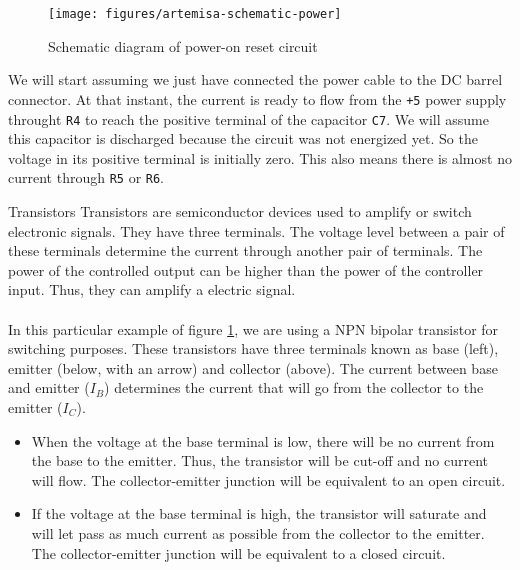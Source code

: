 \begin{figure}[h]
  \centering
  \texttt{[image: figures/artemisa-schematic-power]}
  \caption{Schematic diagram of power-on reset circuit}
  \label{fig:artemisa-schematic-por}
\end{figure}

We will start assuming we just have connected the power cable to the DC barrel connector. At that instant, the current is ready to flow from the {\tt +5} power supply throught {\tt R4} to reach the positive terminal of the capacitor {\tt C7}. We will assume this capacitor is discharged because the circuit was not energized yet. So the voltage in its positive terminal is initially zero. This also means there is almost no current through {\tt R5} or {\tt R6}.

\begin{theory}[h]{Transistors}
  Transistors are semiconductor devices used to amplify or switch electronic signals. They have three terminals. The voltage level between a pair of these terminals determine the current through another pair of terminals. The power of the controlled output can be higher than the power of the controller input. Thus, they can amplify a electric signal.\\\\

  In this particular example of figure \ref{fig:artemisa-schematic-por}, we are using a NPN bipolar transistor for switching purposes. These transistors have three terminals known as base (left), emitter (below, with an arrow) and collector (above). The current between base and emitter ($I_B$) determines the current that will go from the collector to the emitter ($I_C$).

  \begin{itemize}
    \item When the voltage at the base terminal is low, there will be no current from the base to the emitter. Thus, the transistor will be cut-off and no current will flow. The collector-emitter junction will be equivalent to an open circuit.
    \item If the voltage at the base terminal is high, the transistor will saturate and will let pass as much current as possible from the collector to the emitter. The collector-emitter junction will be equivalent to a closed circuit.
  \end{itemize}

\end{theory}

